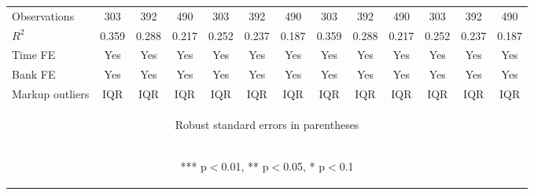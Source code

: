 \documentclass[]{article}
\begin{document}
\begin{center}
\begin{tabular}{lcccccccccccc}
Observations & 303 & 392 & 490 & 303 & 392 & 490 & 303 & 392 & 490 & 303 & 392 & 490 \\
$R^2$ & 0.359 & 0.288 & 0.217 & 0.252 & 0.237 & 0.187 & 0.359 & 0.288 & 0.217 & 0.252 & 0.237 & 0.187 \\
Time FE & Yes & Yes & Yes & Yes & Yes & Yes & Yes & Yes & Yes & Yes & Yes & Yes \\
Bank FE & Yes & Yes & Yes & Yes & Yes & Yes & Yes & Yes & Yes & Yes & Yes & Yes \\
 Markup outliers & IQR & IQR & IQR & IQR & IQR & IQR & IQR & IQR & IQR & IQR & IQR & IQR \\ \hline
\multicolumn{13}{c}{\begin{footnotesize} Robust standard errors in parentheses\end{footnotesize}} \\
\multicolumn{13}{c}{\begin{footnotesize} *** p$<$0.01, ** p$<$0.05, * p$<$0.1\end{footnotesize}} \\
\end{tabular}
\end{center}
\end{document}
